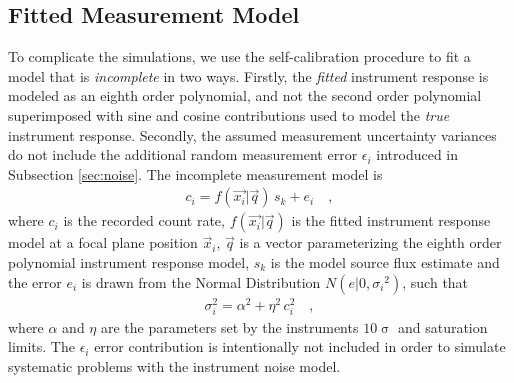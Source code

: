 \documentclass[manuscript]{aastex}
\begin{document}
\subsection{Fitted Measurement Model}
To complicate the simulations, we use the self-calibration procedure to fit a model that is \textit{incomplete} in two ways. Firstly, the \textit{fitted} instrument response is modeled as an eighth order polynomial, and not the second order polynomial superimposed with sine and cosine contributions used to model the \textit{true} instrument response. Secondly, the assumed measurement uncertainty variances do not include the additional random measurement error $\epsilon_{i}$ introduced in Subsection \ref{sec:noise}. The incomplete measurement model is
\begin{eqnarray*}
c_i = f(\vec{x_i} | \vec{q}) \, s_{k} + e_{i} \quad ,
\end{eqnarray*}
where $c_i$ is the recorded count rate, $f(\vec{x_i} | \vec{q})$ is the fitted instrument response model at a focal plane position $\vec{x}_i$, $\vec{q}$ is a vector parameterizing the eighth order polynomial instrument response model, $s_k$ is the model source flux estimate and the error $e_i$ is drawn from the Normal Distribution $N(e|0,{\sigma_i}^2)$, such that
\begin{eqnarray*}
\sigma_{{i}}^{2} = \alpha^{2} + \eta^{2}\, c^{2}_i \quad ,
\end{eqnarray*} 
where $\alpha$ and $\eta$ are the parameters set by the instruments $10\upsigma$ and saturation limits. The $\epsilon_i$ error contribution is intentionally not included in order to simulate systematic problems with the instrument noise model. 
\end{document}
